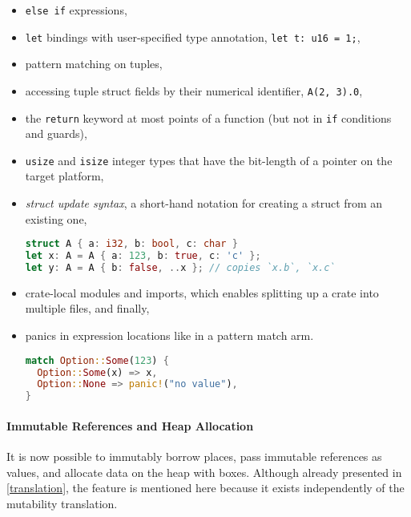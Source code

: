 \begin{itemize}
\item
  \passthrough{\lstinline!else if!} expressions,
\item
  \passthrough{\lstinline!let!} bindings with user-specified type
  annotation, \passthrough{\lstinline!let t: u16 = 1;!},
\item
  pattern matching on tuples,
\item
  accessing tuple struct fields by their numerical identifier,
  \passthrough{\lstinline!A(2, 3).0!},
\item
  the \passthrough{\lstinline!return!} keyword at most points
  of a function (but not in \lstinline!if! conditions and guards),

\item \passthrough{\lstinline!usize!} and \passthrough{\lstinline!isize!}
integer types that have the bit-length of a pointer on the target platform,

\item
  \emph{struct update syntax}, a short-hand notation for creating a
  struct from an existing one,
\begin{lstlisting}[language=Rust, style=short]
struct A { a: i32, b: bool, c: char }
let x: A = A { a: 123, b: true, c: 'c' };
let y: A = A { b: false, ..x }; // copies `x.b`, `x.c`
\end{lstlisting}

\item crate-local modules and imports, which enables splitting up a crate into
multiple files, and finally,

\item
  panics in expression locations like in a pattern match arm.
\begin{lstlisting}[language=Rust, style=short]
match Option::Some(123) {
  Option::Some(x) => x,
  Option::None => panic!("no value"),
}
\end{lstlisting}

\end{itemize}

\paragraph{Immutable References and Heap Allocation}

It is now possible to immutably borrow places, pass immutable references as
values, and allocate data on the heap with boxes. Although already presented in
\autoref{translation}, the feature is mentioned here because it exists
independently of the mutability translation.

